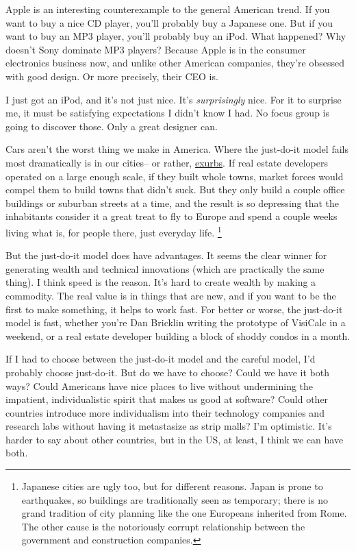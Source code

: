 Apple is an interesting counterexample to the general American trend. If
you want to buy a nice CD player, you'll probably buy a Japanese one.
But if you want to buy an MP3 player, you'll probably buy an iPod. What
happened? Why doesn't Sony dominate MP3 players? Because Apple is in the
consumer electronics business now, and unlike other American companies,
they're obsessed with good design. Or more precisely, their CEO is.

I just got an iPod, and it's not just nice. It's \emph{surprisingly}
nice. For it to surprise me, it must be satisfying expectations I didn't
know I had. No focus group is going to discover those. Only a great
designer can.

Cars aren't the worst thing we make in America. Where the just-do-it
model fails most dramatically is in our cities-- or rather,
\href{denver.html}{exurbs}. If real estate developers operated on a
large enough scale, if they built whole towns, market forces would
compel them to build towns that didn't suck. But they only build a
couple office buildings or suburban streets at a time, and the result is
so depressing that the inhabitants consider it a great treat to fly to
Europe and spend a couple weeks living what is, for people there, just
everyday life. \footnote{Japanese cities are ugly too, but for different reasons. Japan
is prone to earthquakes, so buildings are traditionally seen as
temporary; there is no grand tradition of city planning like the one
Europeans inherited from Rome. The other cause is the notoriously
corrupt relationship between the government and construction companies.}

But the just-do-it model does have advantages. It seems the clear winner
for generating wealth and technical innovations (which are practically
the same thing). I think speed is the reason. It's hard to create wealth
by making a commodity. The real value is in things that are new, and if
you want to be the first to make something, it helps to work fast. For
better or worse, the just-do-it model is fast, whether you're Dan
Bricklin writing the prototype of VisiCalc in a weekend, or a real
estate developer building a block of shoddy condos in a month.

If I had to choose between the just-do-it model and the careful model,
I'd probably choose just-do-it. But do we have to choose? Could we have
it both ways? Could Americans have nice places to live without
undermining the impatient, individualistic spirit that makes us good at
software? Could other countries introduce more individualism into their
technology companies and research labs without having it metastasize as
strip malls? I'm optimistic. It's harder to say about other countries,
but in the US, at least, I think we can have both.

